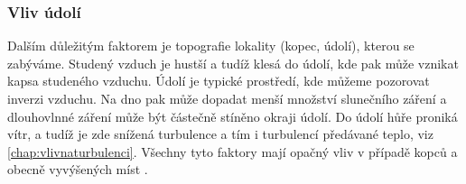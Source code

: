 \subsubsection{Vliv údolí}
Dalším důležitým faktorem je topografie lokality (kopec, údolí), kterou se zabýváme. Studený vzduch je hustší a tudíž klesá do údolí, kde pak může vznikat kapsa studeného vzduchu. Údolí je typické prostředí, kde můžeme pozorovat inverzi vzduchu. Na dno pak může dopadat menší množství slunečního záření a dlouhovlnné záření může být částečně stíněno okraji údolí. Do údolí hůře proniká vítr, a tudíž je zde snížená turbulence a tím i turbulencí předávané teplo, viz \ref{chap:vlivnaturbulenci}. Všechny tyto faktory mají opačný vliv v případě kopců a obecně vyvýšených míst \parencite{alma}. 





